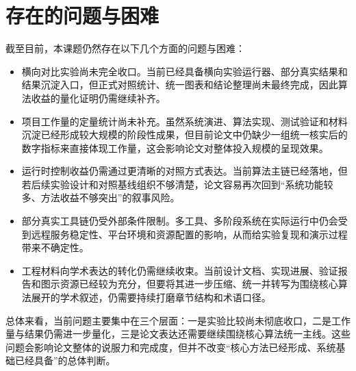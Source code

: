 \section{存在的问题与困难}

截至目前，本课题仍然存在以下几个方面的问题与困难：

\begin{itemize}
	\item 横向对比实验尚未完全收口。当前已经具备横向实验运行器、部分真实结果和结果沉淀入口，但正式对照统计、统一图表和结论整理尚未最终完成，因此算法收益的量化证明仍需继续补齐。
	\item 项目工作量的定量统计尚未补充。虽然系统演进、算法实现、测试验证和材料沉淀已经形成较大规模的阶段性成果，但目前论文中仍缺少一组统一核实后的数字指标来直接体现工作量，这会影响论文对整体投入规模的呈现效果。
	\item 运行时控制收益仍需通过更清晰的对照方式表达。当前算法主链已经落地，但若后续实验设计和对照基线组织不够清楚，论文容易再次回到“系统功能较多、方法收益不够突出”的叙事风险。
	\item 部分真实工具链仍受外部条件限制。多工具、多阶段系统在实际运行中仍会受到远程服务稳定性、平台环境和资源配置的影响，从而给实验复现和演示过程带来不确定性。
	\item 工程材料向学术表达的转化仍需继续收束。当前设计文档、实现进展、验证报告和图示资源已经较为充分，但要将其进一步压缩、统一并转写为围绕核心算法展开的学术叙述，仍需要持续打磨章节结构和术语口径。
\end{itemize}

总体来看，当前问题主要集中在三个层面：一是实验比较尚未彻底收口，二是工作量与结果仍需进一步量化，三是论文表达还需要继续围绕核心算法统一主线。这些问题会影响论文整体的说服力和完成度，但并不改变“核心方法已经形成、系统基础已经具备”的总体判断。
